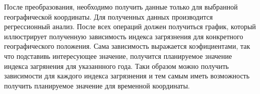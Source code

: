 После преобразования, необходимо получить данные только для выбранной географической координаты.
Для полученных данных производится регрессионный анализ.
После всех операций должен получиться график, который иллюстрирует полученную зависимость индекса загрязнения для конкретного географического положения.
Сама зависимость выражается коэфициентами, так что подставивь интересующее значение, получится планируемое значение индекса загрянения для указаннного года.
Таки образом можно получить зависимости для каждого индекса загрязнения и тем самым иметь возможность получить планируемое значение для временной координаты.

